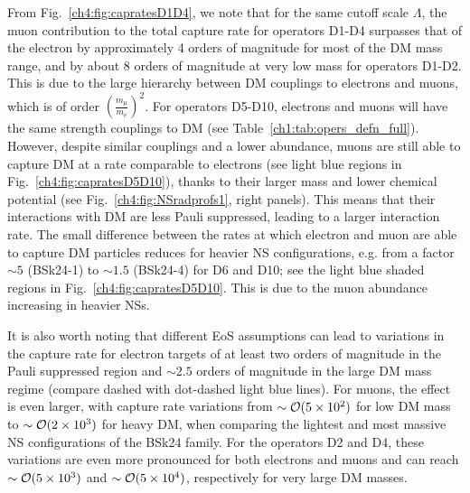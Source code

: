 From Fig.~\ref{ch4:fig:capratesD1D4}, we note that for the same cutoff scale $\Lambda$, the muon contribution to the total capture rate for operators D1-D4 surpasses that of the electron by approximately 4 orders of magnitude for most of the DM mass range, and by about 8 orders of magnitude at very low mass for operators D1-D2. This is due to the large hierarchy between DM couplings to electrons and muons, which is of order $(\frac{m_\mu}{m_e})^2$. 
For operators D5-D10, electrons and muons will have the same strength couplings to DM (see Table~\ref{ch1:tab:opers_defn_full}). However, despite similar couplings and a lower abundance, muons are still able to capture DM at a rate comparable to electrons (see light blue regions in Fig.~\ref{ch4:fig:capratesD5D10}), thanks to their larger mass and lower chemical potential (see Fig.~\ref{ch4:fig:NSradprofs1}, right panels). This means that their interactions with DM are less Pauli suppressed, leading to a larger interaction rate. The small difference between the rates at which electron and muon are able to capture DM particles reduces for heavier NS configurations, e.g. from a factor $\sim5$ (BSk24-1) to $\sim 1.5$ (BSk24-4) for D6 and D10; see the light blue shaded regions in Fig.~\ref{ch4:fig:capratesD5D10}. This is due to the muon abundance increasing in heavier NSs.



It is also worth noting that different EoS assumptions can lead to variations in the capture rate for electron targets of at least two orders of magnitude in the Pauli suppressed region and $\sim 2.5$ orders of magnitude in the large DM mass regime (compare dashed with dot-dashed light blue lines). For muons, the effect is even larger, with capture rate variations from $\sim {\cal O}(5\times 10^2)$ for low DM mass to $\sim {\cal O}(2\times 10^3)$ for heavy DM, when comparing the lightest and most massive NS configurations of the BSk24 family. For the operators D2 and D4, these variations are even more pronounced for both electrons and muons and can reach  $\sim {\cal O}(5\times 10^3)$ and  $\sim {\cal O}(5\times 10^4)$, respectively for very large DM masses. 


